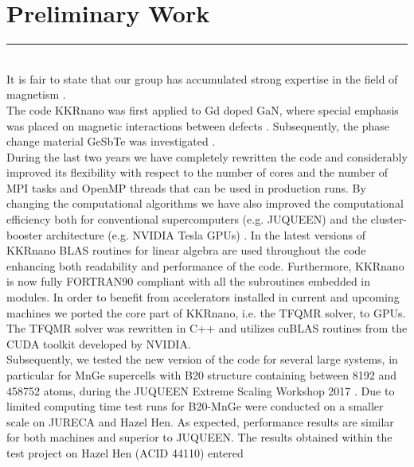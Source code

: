 \documentclass [a4paper, 12pt]{article}
\begin{document}
\section{Preliminary Work}
\rule{\textwidth}{0.4pt}\\


It is fair to state that our group has accumulated strong expertise
in the field of magnetism \cite{bode_chiral_2007,heinze_spontaneous_2011,brede_long-range_2014,
dupe_engineering_2016,gayles_dzyaloshinskii-moriya_2015}.
\\
The code KKRnano was first applied to Gd doped GaN, where special emphasis was placed on
magnetic interactions between defects \cite{thiess_superparamagnetism_2012}. Subsequently,
the phase change material GeSbTe was investigated \cite{zhang_role_2012}.
\\
During the last two years we have completely rewritten the code and considerably improved 
its flexibility with respect to the number of cores and the number of MPI tasks and
OpenMP threads that can be used in production runs. By changing the computational algorithms
we have also improved the computational efficiency both for conventional
supercomputers (e.g. JUQUEEN) and the cluster-booster architecture
(e.g. NVIDIA Tesla GPUs) \cite{dutot_addressing_2016}.
In the latest versions of KKRnano BLAS routines for linear algebra are used throughout the code
enhancing both readability and performance of the code. Furthermore, KKRnano is now
fully FORTRAN90 compliant with all the subroutines embedded in modules.
In order to benefit from accelerators installed in current and upcoming machines we
ported the core part of KKRnano, i.e. the TFQMR solver, to GPUs. The TFQMR solver was rewritten
in C++ and utilizes cuBLAS routines from the CUDA toolkit developed by NVIDIA.
\\
Subsequently, we tested the new version of the code for several large systems, 
in particular for MnGe supercells with B20 structure containing between 8192 and 458752 atoms,
during the JUQUEEN Extreme Scaling Workshop 2017 \cite{brommel_juqueen_2017}.
Due to limited computing time test runs for B20-MnGe were conducted on a smaller scale on JURECA and Hazel Hen.
As expected, performance results are similar for both machines and superior to JUQUEEN.
The results obtained within the test project on Hazel Hen (ACID 44110) entered
\end{document}
